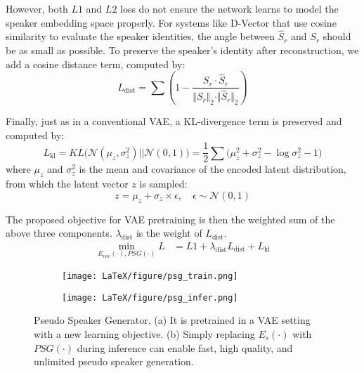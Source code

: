\documentclass[a4paper]{article}
\begin{document}
    However, both $L1$ and $L2$ loss do not ensure the network learns to model the speaker embedding space properly. For systems like D-Vector that use cosine similarity to evaluate the speaker identities, the angle between $\hat{S}_{r}$ and $S_{r}$ should be as small as possible. To preserve the speaker's identity after reconstruction, we add a cosine distance term, computed by:
    \[L_{\text{dist}} = \sum (1 - \dfrac{S_{r} \cdot \hat{S}_{r}}{\Vert S_{r} \Vert _2 \cdot \Vert \hat{S}_{r} \Vert _2})\]
    
    Finally, just as in a conventional VAE, a KL-divergence term is preserved and computed by:
    \[L_{\text{kl}} = KL\Big(\mathcal{N}(\mu_z, \sigma_z^2) || \mathcal{N}(0, 1)\Big) = \frac{1}{2} \sum (\mu_z^{2} + \sigma_z^{2} - \log{\sigma_z^{2} - 1)}\] 
    where $\mu_z$ and $\sigma_z^2$ is the mean and covariance of the encoded latent distribution, from which the latent vector $z$ is sampled: 
    \[z = \mu_z + \sigma_z \times \epsilon, \quad
    \epsilon \sim \mathcal{N}(0, 1)\]

    The proposed objective for VAE pretraining is then the weighted sum of the above three components. $\lambda_\text{dist}$ is the weight of $L_\text{dist}$.
    \begin{align*}
        \min_{E_{vae}(\cdot), PSG(\cdot)} L & = L1 + \lambda_\text{dist} L_\text{dist} + L_{\text{kl}}
    \end{align*}
    
    \begin{figure}[th]
        \begin{subfigure}[c]{0.49\columnwidth}
            \centering
            \texttt{[image: LaTeX/figure/psg\_train.png]}
            \label{fig:PSG train figure}
        \end{subfigure}\hfill
        \begin{subfigure}[c]{0.49\columnwidth}
            \centering
            \texttt{[image: LaTeX/figure/psg\_infer.png]}
            \label{fig:PSG infer figure}
        \end{subfigure}
        \caption{Pseudo Speaker Generator. (a) It is pretrained in a VAE setting with a new learning objective. (b) Simply replacing $E_s(\cdot)$ with $PSG(\cdot)$ during inference can enable fast, high quality, and unlimited pseudo speaker generation.}
        \label{fig:PSG figure}
    \end{figure}
    
\end{document}
